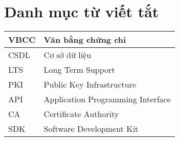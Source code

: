 \chapter*{Danh mục từ viết tắt}
\begin{center}
\renewcommand{\arraystretch}{1.5}
\begin{longtable}{ |l @{\qquad} |l| }
\hline
VBCC   & Văn bằng chứng chỉ  \\ \hline
CSDL   & Cơ sở dữ liệu  \\ \hline
LTS  &  Long Term Support  \\ \hline
PKI  &  Public Key Infrastructure \\ \hline
API    & Application Programming Interface  \\ \hline
CA    & Certificate Authority \\ \hline
SDK    & Software Development Kit \\ \hline

\end{longtable}
\end{center}